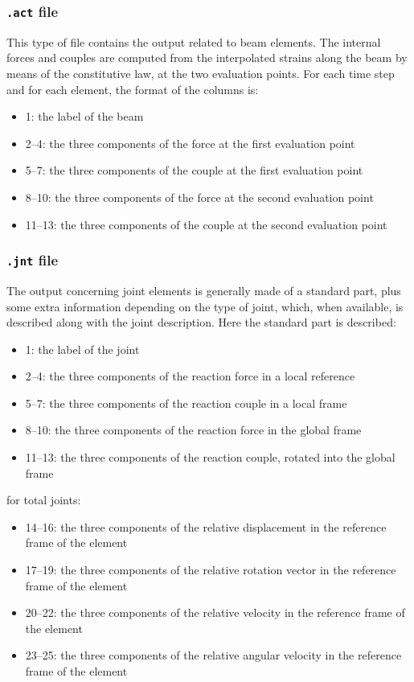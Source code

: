\subsubsection{\texttt{.act} file}

This type of file  contains the output related to beam elements. The internal forces and couples are computed from the interpolated strains along the beam by means of the constitutive law, at the two evaluation points. For each time step and for each element, the format of the columns is:

\begin{itemize}
    \item 1: the label of the beam
    \item 2–4: the three components of the force at the first evaluation point
    \item 5–7: the three components of the couple at the first evaluation point
    \item 8–10: the three components of the force at the second evaluation point
    \item 11–13: the three components of the couple at the second evaluation point
\end{itemize}


\subsubsection{\texttt{.jnt} file}

The output concerning joint elements is generally made of a standard part, plus some extra information depending on the type of joint, which, when available, is described along with the joint description. Here the standard part is described:

\begin{itemize}
    \item 1: the label of the joint
    \item 2–4: the three components of the reaction force in a local reference
    \item 5–7: the three components of the reaction couple in a local frame
    \item 8–10: the three components of the reaction force in the global frame
    \item 11–13: the three components of the reaction couple, rotated into the global frame
\end{itemize}

for total joints:

\begin{itemize}
    \item 14–16: the three components of the relative displacement in the reference frame of the element
    \item 17–19: the three components of the relative rotation vector in the reference frame of the element
    \item 20–22: the three components of the relative velocity in the reference frame of the element
    \item 23–25: the three components of the relative angular velocity in the reference frame of the element
\end{itemize}

